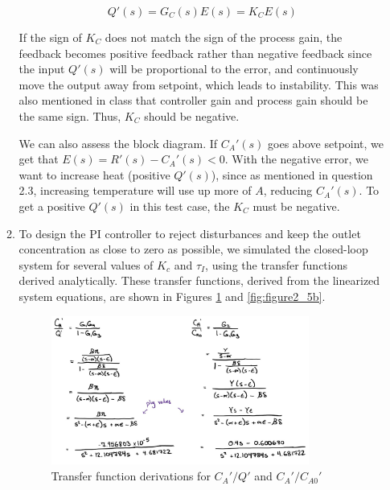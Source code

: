 \documentclass[12pt]{article}
\begin{document}
\begin{enumerate}
\begin{enumerate}
    \[
    Q'(s) = G_C(s) E(s) = K_C E(s)
    \]
    
    If the sign of \(K_C\) does not match the sign of the process gain, the feedback becomes positive feedback rather than negative feedback since the input \(Q'(s)\) will be proportional to the error, and continuously move the output away from setpoint, which leads to instability. This was also mentioned in class that controller gain and process gain should be the same sign. Thus, \(K_C\) should be negative.

    \medskip

    We can also assess the block diagram. If \(C_A'(s)\) goes above setpoint, we get that \(E(s) = R'(s) - C_A'(s) < 0\). With the negative error, we want to increase heat (positive \(Q'(s)\)), since as mentioned in question 2.3, increasing temperature will use up more of \(A\), reducing \(C_A'(s)\). To get a positive \(Q'(s)\) in this test case, the \(K_C\) must be negative.

    \item To design the PI controller to reject disturbances and keep the outlet concentration as close to zero as possible, we simulated the closed-loop system for several values of $K_c$ and $\tau_I$, using the transfer functions derived analytically. These transfer functions, derived from the linearized system equations, are shown in Figures \ref{fig:figure2_5a} and \ref{fig:figure2_5b}.
    
    \begin{figure}[H]
      \centering
      \includegraphics[width=0.85\textwidth]{Figures/figure2_5a.png}
      \caption{Transfer function derivations for $C_A'/Q'$ and $C_A'/C_{A0}'$}
      \label{fig:figure2_5a}
    \end{figure}
    

\end{enumerate}
\end{enumerate}
\end{document}
